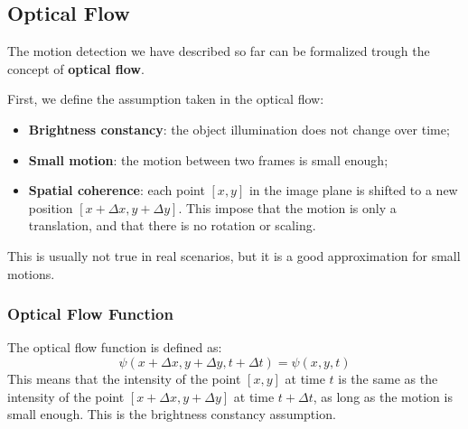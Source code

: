 \subsection{Optical Flow}
The motion detection we have described so far can be formalized trough the concept of \textbf{optical flow}.

First, we define the assumption taken in the optical flow:
\begin{itemize}
    \item \textbf{Brightness constancy}: the object illumination does not change over time;
    \item \textbf{Small motion}: the motion between two frames is small enough;
    \item \textbf{Spatial coherence}: each point $[x, y]$ in the image plane is shifted to a new position $[x + \Delta x, y + \Delta y]$.
    This impose that the motion is only a translation, and that there is no rotation or scaling.
\end{itemize}
This is usually not true in real scenarios, but it is a good approximation for small motions.

\subsubsection{Optical Flow Function}
The optical flow function is defined as:
\begin{equation}
    \label{eq:optical_flow}
    \psi(x + \Delta x, y + \Delta y, t + \Delta t) = \psi(x, y, t)
\end{equation}
This means that the intensity of the point $[x, y]$ at time $t$ is the same as the intensity of the point $[x + \Delta x, y + \Delta y]$ at time $t + \Delta t$,
as long as the motion is small enough. This is the brightness constancy assumption.


